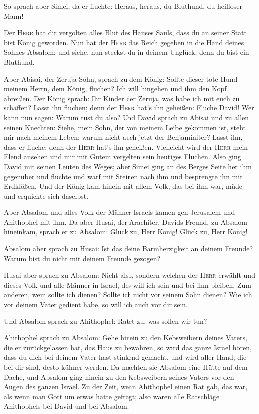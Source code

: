  So sprach aber Simei, da er fluchte: Heraus, heraus, du
Bluthund, du heilloser Mann!

 Der \textsc{Herr} hat dir vergolten alles Blut des Hauses
Sauls, dass du an seiner Statt bist König geworden. Nun hat der
\textsc{Herr} das Reich gegeben in die Hand deines Sohnes Absalom; und
siehe, nun steckst du in deinem Unglück; denn du bist ein Bluthund.

 Aber Abisai, der Zeruja Sohn, sprach zu dem König: Sollte
dieser tote Hund meinem Herrn, dem König, fluchen? Ich will hingehen und
ihm den Kopf abreißen.  Der König sprach: Ihr Kinder der
Zeruja, was habe ich mit euch zu schaffen? Lasst ihn fluchen; denn der
\textsc{Herr} hat's ihn geheißen: Fluche David! Wer kann nun sagen:
Warum tust du also?  Und David sprach zu Abisai und zu
allen seinen Knechten: Siehe, mein Sohn, der von meinem Leibe gekommen
ist, steht mir nach meinem Leben; warum nicht auch jetzt der
Benjaminiter? Lasst ihn, dass er fluche; denn der \textsc{Herr} hat's
ihn geheißen.  Vielleicht wird der \textsc{Herr} mein
Elend ansehen und mir mit Gutem vergelten sein heutiges Fluchen.
 Also ging David mit seinen Leuten des Weges; aber Simei
ging an des Berges Seite her ihm gegenüber und fluchte und warf mit
Steinen nach ihm und besprengte ihn mit Erdklößen.  Und
der König kam hinein mit allem Volk, das bei ihm war, müde und erquickte
sich daselbst.

 Aber Absalom und alles Volk der Männer Israels kamen gen
Jerusalem und Ahithophel mit ihm.  Da aber Husai, der
Arachiter, Davids Freund, zu Absalom hineinkam, sprach er zu Absalom:
Glück zu, Herr König! Glück zu, Herr König!

 Absalom aber sprach zu Husai: Ist das deine
Barmherzigkeit an deinem Freunde? Warum bist du nicht mit deinem Freunde
gezogen?

 Husai aber sprach zu Absalom: Nicht also, sondern
welchen der \textsc{Herr} erwählt und dieses Volk und alle Männer in
Israel, des will ich sein und bei ihm bleiben.  Zum
anderen, wem sollte ich dienen? Sollte ich nicht vor seinem Sohn dienen?
Wie ich vor deinem Vater gedient habe, so will ich auch vor dir sein.

 Und Absalom sprach zu Ahithophel: Ratet zu, was sollen
wir tun?

 Ahithophel sprach zu Absalom: Gehe hinein zu den
Kebsweibern deines Vaters, die er zurückgelassen hat, das Haus zu
bewahren, so wird das ganze Israel hören, dass du dich bei deinem Vater
hast stinkend gemacht, und wird aller Hand, die bei dir sind, desto
kühner werden.  Da machten sie Absalom eine Hütte auf dem
Dache, und Absalom ging hinein zu den Kebsweibern seines Vaters vor den
Augen des ganzen Israel.  Zu der Zeit, wenn Ahithophel
einen Rat gab, das war, als wenn man Gott um etwas hätte gefragt; also
waren alle Ratschläge Ahithophels bei David und bei Absalom.

